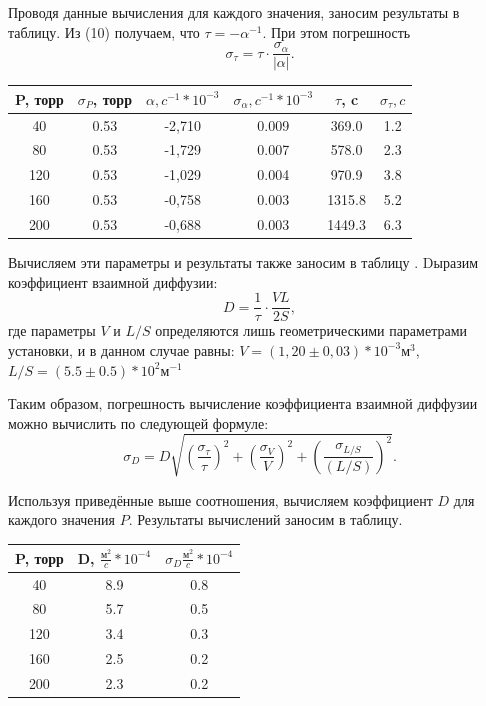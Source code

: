 \documentclass[12pt,a4paper]{article}
\begin{document}
Проводя данные вычисления для каждого значения, заносим результаты в таблицу. Из (10) получаем, что $\tau=-\alpha^{-1}$. При этом погрешность \[ \sigma_\tau = \tau \cdot \frac{\sigma_{\alpha}}{|\alpha|}. \]

\begin{table}[H]
	\centering
	\begin{tabular}{|c|c|c|c|c|c|}
		\hline
		P, торр & $\sigma_{P}$, торр & $\alpha, c^{-1}*10^{-3}$ & $\sigma_{\alpha}, c^{-1} * 10^{-3}$ & $\tau$, c & $\sigma_{\tau}, c$ \\ \hline
		40 & 0.53 & -2,710 & 0.009 & 369.0 & 1.2 \\ \hline
		80 & 0.53 & -1,729 & 0.007 & 578.0 & 2.3 \\ \hline
		120 & 0.53 & -1,029 & 0.004 & 970.9 & 3.8 \\ \hline
		160 & 0.53 & -0,758 & 0.003 & 1315.8 & 5.2 \\ \hline
		200 & 0.53 & -0,688 & 0.003 & 1449.3 & 6.3 \\ \hline
	\end{tabular}
\end{table}

Вычисляем эти параметры и результаты также заносим в таблицу . Dыразим коэффициент взаимной диффузии: \begin{equation}
 D = \frac{1}{\tau}\cdot\frac{VL}{2S},
\end{equation} где параметры $ V $ и $ L/S $ определяются лишь геометрическими параметрами установки, и в данном случае равны: $ V = (1,20 \pm 0,03)*10^{-3} \text{м}^3$, $ L/S = (5.5 \pm 0.5) * 10^2 \text{м}^{-1}$

Таким образом, погрешность вычисление коэффициента взаимной диффузии можно вычислить по следующей формуле:
\[ \sigma_D = D\sqrt{\left(\frac{\sigma_\tau}{\tau}\right)^2+\left(\frac{\sigma_V}{V}\right)^2+\left(\frac{\sigma_{L/S}}{(L/S)}\right)^2}. \]

Используя приведённые выше соотношения, вычисляем коэффициент $ D $ для каждого значения $ P $. Результаты вычислений заносим в таблицу.

\begin{table}[H]
	\centering
	\begin{tabular}{|c|c|c|}
		\hline
		P, торр & D, $\frac{\text{м}^2}{c} * 10^{-4}$ & $\sigma_{D}\frac{\text{м}^2}{c} * 10^{-4}$ \\ \hline
		40 & 8.9 & 0.8 \\ \hline
		80 & 5.7 &  0.5\\ \hline
		120 & 3.4 & 0.3 \\ \hline
		160 & 2.5 & 0.2 \\ \hline
		200 & 2.3 & 0.2 \\ \hline
	\end{tabular}
\end{table}
\end{document}
